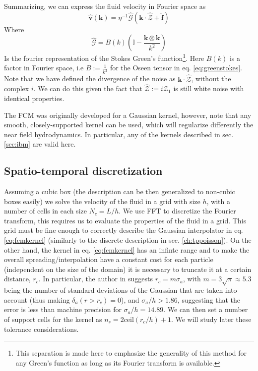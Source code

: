 \documentclass[ twoside,openright,titlepage,numbers=noenddot,%
headinclude,footinclude,cleardoublepage=empty,abstract=on,
BCOR=5mm,paper=a4,fontsize=11pt, dvipsnames
]{scrreprt}
\renewcommand{\vec}[1]{\bm{#1}}
\newcommand{\tens}[1]{\bm{\mathcal{#1}}}
\newcommand{\fou}[1]{\widehat{#1}}
\newcommand{\fvel}{v}
\begin{document}
Summarizing, we can express the fluid velocity in Fourier space as
\begin{equation}
  \label{eq:fcmvel}
  \fou{\vec{\fvel}}(\vec{k}) = \eta^{-1}\hat{\tens{G}}\left(\vec{k}\cdot\fou{\mathcal{Z}} + \fou{\vec{f}}\right)
\end{equation}
Where
\begin{equation}
  \fou{\tens{G}} = B(k)\left(\mathbb{I} - \frac{\vec{k}\otimes\vec{k}}{k^2}\right)
\end{equation}
Is the fourier representation of the Stokes Green's function\footnote{This separation is made here to emphasize the generality of this method for any Green's function as long as its Fourier transform is available.}.
Here $B(k)$ is a factor in Fourier space, i.e $B := \frac{1}{k^2}$ for the Oseen tensor in eq. \eqref{eq:greenstokes}.
Note that we have defined the divergence of the noise as $\vec{k}\cdot\fou{\mathcal{Z}}$, without the complex $i$. We can do this given the fact that $\fou{\mathcal{Z}} := i\fou{\mathcal{Z}}_1$ is still white noise with identical properties.

The \gls{FCM} was originally developed for a Gaussian kernel, however, note that any smooth, closely-supported kernel can be used, which will regularize differently the near field hydrodynamics. In particular, any of the kernels described in sec. \ref{sec:ibm} are valid here.

\subsection*{Spatio-temporal discretization}
Assuming a cubic box (the description can be then generalized to non-cubic boxes easily) we solve the velocity of the fluid in a grid with size $h$, with a number of cells in each size $N_c = L/h$.
We use \gls{FFT} to discretize the Fourier transform, this requires us to evaluate the properties of the fluid in a grid. This grid must be fine enough to correctly describe the Gaussian interpolator in eq. \eqref{eq:fcmkernel} (similarly to the discrete description in sec. \ref{ch:tppoisson}). On the other hand, the kernel in eq. \eqref{eq:fcmkernel} has an infinte range and to make the overall spreading/interpolation have a constant cost for each particle (independent on the size of the domain) it is necessary to truncate it at a certain distance, $r_c$. In particular, the author in \cite{Keaveny2014} suggests $r_c=m \sigma_a$, with $m=3\sqrt{\pi}\approx 5.3$ being the number of standard deviations of the Gaussian that are taken into account (thus making $\delta_a(r>r_c) = 0$), and $\sigma_a/h > 1.86$, suggesting that the error is less than machine precision for $\sigma_a/h = 14.89$. We can then set a number of support cells for the kernel as $n_s = 2 \textrm{ceil}(r_c/h)+1$.
We will study later these tolerance considerations.
\end{document}
